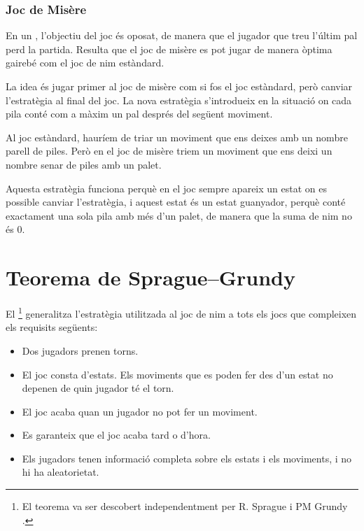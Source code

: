 \subsubsection{Joc de Misère}


En un , l'objectiu del joc és oposat, de manera que
el jugador que treu l'últim pal perd la partida. Resulta que el joc de
misère es pot jugar de manera òptima gairebé com el joc de nim estàndard.

La idea és jugar primer al joc de misère com si fos el joc estàndard,
però canviar l'estratègia al final del joc. La nova estratègia
s'introdueix en la situació on cada pila conté com a màxim un pal
després del següent moviment.

Al joc estàndard, hauríem de triar un moviment que ens deixes amb un
nombre parell de piles. Però en el joc de misère triem un moviment
que ens deixi un nombre senar de piles amb un palet.

Aquesta estratègia funciona perquè en el joc sempre apareix un estat
on es possible canviar l'estratègia, i aquest estat és un estat
guanyador, perquè conté exactament una sola pila amb més d'un palet,
de manera que la suma de nim no és 0.

\section{Teorema de Sprague–Grundy}


El \footnote{El teorema va ser
descobert independentment per R. Sprague \cite{spr35} i PM Grundy
\cite{gru39}.} generalitza l'estratègia utilitzada al joc de nim a
tots els jocs que compleixen els requisits següents:


\begin{itemize}[noitemsep]
\item Dos jugadors prenen torns.
\item El joc consta d'estats. Els moviments que es poden
fer des d'un estat no depenen de quin jugador té el torn.
\item El joc acaba quan un jugador no pot fer un moviment.
\item Es garanteix que el joc acaba tard o d'hora.
\item Els jugadors tenen informació completa sobre
els estats i els moviments, i no hi ha aleatorietat.
\end{itemize}

